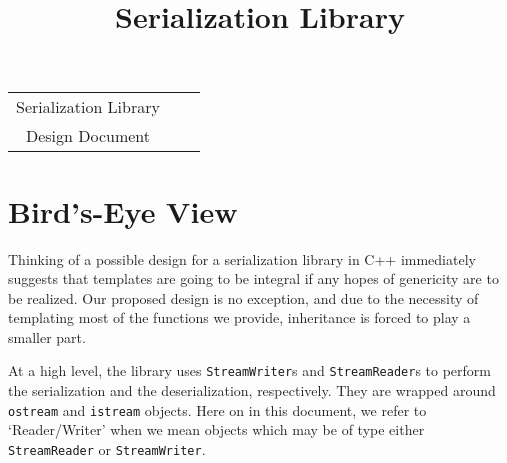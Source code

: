 \documentclass{article}
\begin{document}
\lstset{language=C++,captionpos=b,basicstyle=\small\sffamily,
  columns=fullflexible, xleftmargin=.25in, xrightmargin=.25in}
\newcommand{\choice}[1]{\textbf{Choice} #1}
\newcommand{\reason}[1]{\textbf{Reason} #1}
\newcommand{\term}[1]{\textbf{#1}}

\newcommand{\code}[1]{\lstinline!#1!}
\newcommand{\citem}[1]{\item{\code{#1}}}

\newcommand{\lclass}[1]
{
\noindent\makebox[\linewidth]{\rule{\textwidth}{1pt}} 

\textsc{Class} \code{#1}
}
\newcommand{\class}[1]
{
\textsc{Class} \code{#1}
}
\newcommand{\eoclass}
{
\noindent\makebox[\linewidth]{\rule{\textwidth}{1pt}}
}

\newcommand{\desc}[1]{\textbf{Description} #1}
\newcommand{\mems}[1]{\textbf{Data Members} \\ #1}


\newcommand{\cons}[1]{\textbf{Construction} \\ #1}
\newcommand{\oper}[1]{\textbf{Operators} \\ #1}
\newcommand{\memfns}[1]{\textbf{Member Functions} \\ #1}

\title{\textbf{Serialization Library}}
\maketitle
\begin{center}
\begin{tabular}{c c c}
Serialization Library \\
Design Document
\end{tabular}
\end{center}

\vspace{1.5cm}

\tableofcontents

\section{Bird's-Eye View}
Thinking of a possible design for a serialization library in C++
immediately suggests that templates are going to be integral if any
hopes of genericity are to be realized. Our proposed design is no
exception, and due to the necessity of templating most of the
functions we provide, inheritance is forced to play a smaller part.

At a high level, the library uses \code{StreamWriter}s and
\code{StreamReader}s to perform the serialization and the
deserialization, respectively. They are wrapped around \code{ostream}
and \code{istream} objects. Here on in this document, we refer to
`Reader/Writer' when we mean objects which may be of type either
\code{StreamReader} or \code{StreamWriter}.
\end{document}
